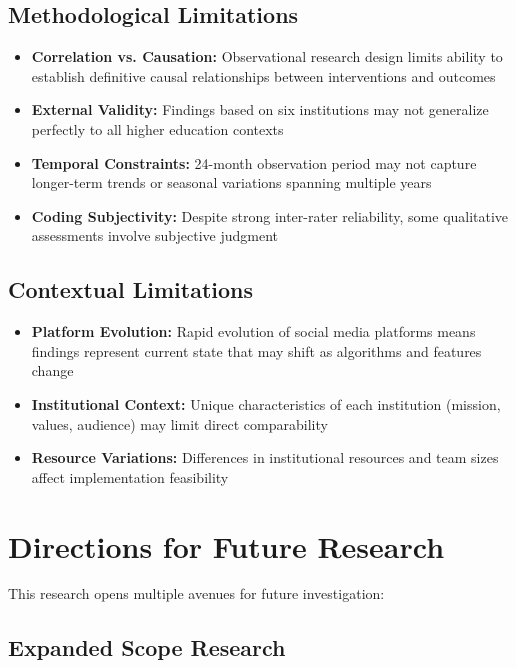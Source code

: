 \documentclass[12pt]{report}
\begin{document}
\subsection{Methodological Limitations}

\begin{itemize}
\item \textbf{Correlation vs. Causation:} Observational research design limits ability to establish definitive causal relationships between interventions and outcomes
\item \textbf{External Validity:} Findings based on six institutions may not generalize perfectly to all higher education contexts
\item \textbf{Temporal Constraints:} 24-month observation period may not capture longer-term trends or seasonal variations spanning multiple years
\item \textbf{Coding Subjectivity:} Despite strong inter-rater reliability, some qualitative assessments involve subjective judgment
\end{itemize}

\subsection{Contextual Limitations}

\begin{itemize}
\item \textbf{Platform Evolution:} Rapid evolution of social media platforms means findings represent current state that may shift as algorithms and features change
\item \textbf{Institutional Context:} Unique characteristics of each institution (mission, values, audience) may limit direct comparability
\item \textbf{Resource Variations:} Differences in institutional resources and team sizes affect implementation feasibility
\end{itemize}

\section{Directions for Future Research}

This research opens multiple avenues for future investigation:

\subsection{Expanded Scope Research}
\end{document}
